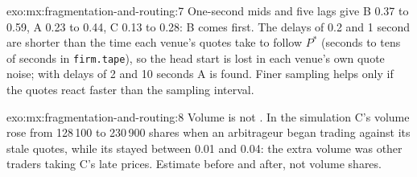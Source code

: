 \begin{solution}{exo:mx:fragmentation-and-routing:7}
One-second mids and five lags give B 0.37 to 0.59, A 0.23 to 0.44, C 0.13 to 0.28: B comes first. The delays of 0.2 and 1 second are shorter than the
time each venue's quotes take to follow $P^\ast$ (seconds to tens of seconds in \texttt{firm.tape}), so the head start is lost in each venue's own quote
noise; with delays of 2 and 10 seconds A is found. Finer sampling helps only if the quotes react faster than the sampling interval.
\end{solution}

\begin{solution}{exo:mx:fragmentation-and-routing:8}
Volume is not . In the simulation C's volume rose from 128\,100 to 230\,900 shares when an arbitrageur began trading against its stale
quotes, while its  stayed between 0.01 and 0.04: the extra volume was other traders taking C's late prices. Estimate 
before and after, not volume shares.
\end{solution}

